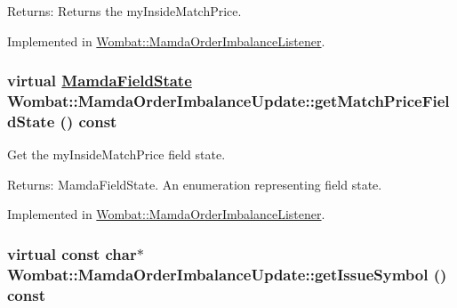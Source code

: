 \begin{Desc}
\item[Returns:]Returns the my\-Inside\-Match\-Price. \end{Desc}


Implemented in \hyperlink{classWombat_1_1MamdaOrderImbalanceListener_d55a2fc95960a2629c498eba6fb8b43d}{Wombat::Mamda\-Order\-Imbalance\-Listener}.\hypertarget{classWombat_1_1MamdaOrderImbalanceUpdate_63f201f6bf8fbd1d7f08da20d75031be}{
\subsubsection[getMatchPriceFieldState]{\setlength{\rightskip}{0pt plus 5cm}virtual \hyperlink{namespaceWombat_93aac974f2ab713554fd12a1fa3b7d2a}{Mamda\-Field\-State} Wombat::Mamda\-Order\-Imbalance\-Update::get\-Match\-Price\-Field\-State () const}}
\label{classWombat_1_1MamdaOrderImbalanceUpdate_63f201f6bf8fbd1d7f08da20d75031be}


Get the my\-Inside\-Match\-Price field state. 

\begin{Desc}
\item[Returns:]Mamda\-Field\-State. An enumeration representing field state. \end{Desc}


Implemented in \hyperlink{classWombat_1_1MamdaOrderImbalanceListener_ca43f8571100db2c3dc6a81c9ece7d4b}{Wombat::Mamda\-Order\-Imbalance\-Listener}.\hypertarget{classWombat_1_1MamdaOrderImbalanceUpdate_20fd3192f5d79eae73cf0f4d871cdac2}{
\subsubsection[getIssueSymbol]{\setlength{\rightskip}{0pt plus 5cm}virtual const char$\ast$ Wombat::Mamda\-Order\-Imbalance\-Update::get\-Issue\-Symbol () const}}
\label{classWombat_1_1MamdaOrderImbalanceUpdate_20fd3192f5d79eae73cf0f4d871cdac2}



